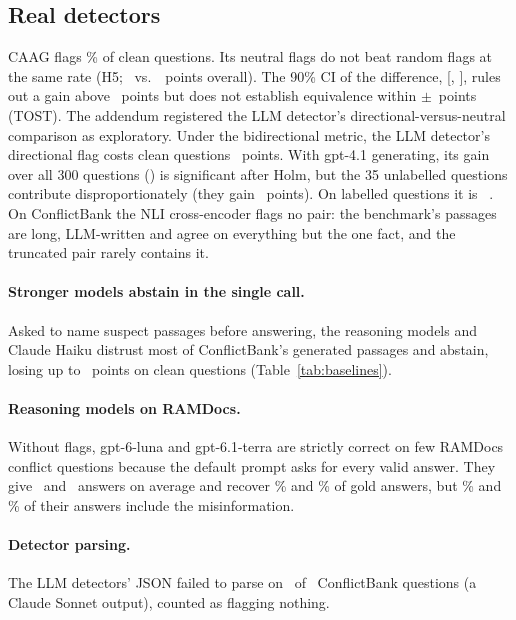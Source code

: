 \subsection{Real detectors}
CAAG flags \cleanFprCaag\% of clean questions. Its neutral flags do not beat random flags at the same rate (H5;
\dCaagFlagAll\ vs.\ \dRandFlagAll\ points overall). The 90\% CI of the difference, [\tostLo, \tostHi], rules out a
gain above \tostHi\ points but does not establish equivalence within $\pm$\tostMargin\ points (TOST). The
addendum registered the LLM detector's directional-versus-neutral comparison as exploratory.
Under the bidirectional metric, the LLM detector's directional flag costs clean questions \arLlmDirClean\ points. With
gpt-4.1 generating, its gain over all 300 questions (\gptLlmDirAll) is significant after Holm, but the 35
unlabelled questions contribute disproportionately (they gain \agptexclLlmDir\ points). On labelled
questions it is \gptlabLlmDir\ \gptlabLlmDirCI. On ConflictBank the NLI cross-encoder flags no pair:
the benchmark's passages are long, LLM-written and agree on everything but the one fact, and the truncated pair rarely
contains it.

\paragraph{Stronger models abstain in the single call.} Asked to name suspect passages before answering, the reasoning
models and Claude Haiku distrust most of ConflictBank's generated passages and abstain, losing up to
\azSgTerraSelfIdentifyClean\ points on clean questions (Table~\ref{tab:baselines}).

\paragraph{Reasoning models on RAMDocs.} Without flags, gpt-6-luna and gpt-6.1-terra are
strictly correct on few RAMDocs conflict questions because the default prompt asks for every valid answer. They give
\mixRdLunaNAnswers\ and \mixRdTerraNAnswers\ answers on average and recover \mixRdLunaRecall\% and
\mixRdTerraRecall\% of gold answers, but \mixRdLunaMisinfo\% and \mixRdTerraMisinfo\% of their answers include
the misinformation.

\paragraph{Detector parsing.} The LLM detectors' JSON failed to parse on \parseFailTotal\ of \parseFailN\ ConflictBank
questions (a Claude Sonnet output), counted as flagging nothing.

